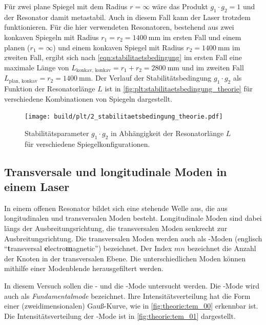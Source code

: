     Für zwei plane Spiegel mit dem Radius $r = \infty$ wäre das Produkt $g_1 \cdot g_2 = 1$ und der Resonator damit metastabil.
    Auch in diesem Fall kann der Laser trotzdem funktionieren.
    Für die hier verwendeten Resonatoren,
    bestehend aus zwei konkaven Spiegeln mit Radius $r_1 = r_2 = \SI{1400}{\milli\meter}$ im ersten Fall
    und einem planen ($r_1 = \infty$) und einem konkaven Spiegel mit Radius $r_2 = \SI{1400}{\milli\meter}$ im zweiten Fall,
    ergibt sich nach \autoref{eqn:stabilitaetsbedingung} im ersten Fall eine maximale Länge von $L_\text{konkav, konkav} = r_1 + r_2 = \SI{2800}{\milli\meter}$
    und im zweiten Fall $L_\text{plan, konkav} = r_2 = \SI{1400}{\milli\meter}$.
    Der Verlauf der Stabilitätsbedingung $g_1 \cdot g_2$ als Funktion der Resonatorlänge $L$ ist in \autoref{fig:plt:stabilitaetsbedingung_theorie}
    für verschiedene Kombinationen von Spiegeln dargestellt.

    \begin{figure}[H]
        \centering
        \texttt{[image: build/plt/2\_stabilitaetsbedingung\_theorie.pdf]}
        \caption{Stabilitätsparameter $g_1 \cdot g_2$ in Abhängigkeit der Resonatorlänge $L$ für verschiedene Spiegelkonfigurationen.}
        \label{fig:plt:stabilitaetsbedingung_theorie}
    \end{figure}



\subsection{Transversale und longitudinale Moden in einem Laser}
\label{sec:moden}

    In einem offenen Resonator bildet sich eine stehende Welle aus,
    die aus longitudinalen und transversalen Moden besteht.
    Longitudinale Moden sind dabei längs der Ausbreitungsrichtung,
    die transversalen Moden senkrecht zur Ausbreitungsrichtung.
    Die transversalen Moden werden auch als -Moden (englisch \enquote{\textbf{t}ransversal \textbf{e}lectro\textbf{m}agnetic}) bezeichnet.
    Der Index $mn$ bezeichnet die Anzahl der Knoten in der transversalen Ebene.
    Die unterschiedlichen Moden können mithilfe einer Modenblende herausgefiltert werden.

    In diesem Versuch sollen die - und die -Mode untersucht werden.
    Die -Mode wird auch als \textit{Fundamentalmode} bezeichnet.
    Ihre Intensitätsverteilung hat die Form einer (zweidimensionalen) Gauß-Kurve,
    wie in \autoref{fig:theorie:tem_00} erkennbar ist.
    Die Intensitätsverteilung der -Mode ist in \autoref{fig:theorie:tem_01} dargestellt.

